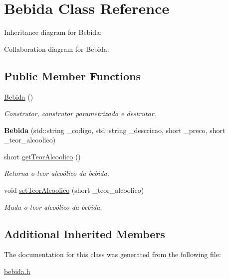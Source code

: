 \hypertarget{classBebida}{}\section{Bebida Class Reference}
\label{classBebida}


Inheritance diagram for Bebida\+:


Collaboration diagram for Bebida\+:
\subsection*{Public Member Functions}
\begin{DoxyCompactItemize}
\item 
\hyperlink{classBebida_afab3bc3b54a7e55049ed36fae3479dfb}{Bebida} ()\hypertarget{classBebida_afab3bc3b54a7e55049ed36fae3479dfb}{}\label{classBebida_afab3bc3b54a7e55049ed36fae3479dfb}

\begin{DoxyCompactList}\small\item\em Construtor, construtor parametrizado e destrutor. \end{DoxyCompactList}\item 
{\bfseries Bebida} (std\+::string \+\_\+codigo, std\+::string \+\_\+descricao, short \+\_\+preco, short \+\_\+teor\+\_\+alcoolico)\hypertarget{classBebida_a1d955c3b71c0159581806eafb05cd52a}{}\label{classBebida_a1d955c3b71c0159581806eafb05cd52a}

\item 
short \hyperlink{classBebida_a12416f60ae201da672ab9cd950d2fa70}{get\+Teor\+Alcoolico} ()\hypertarget{classBebida_a12416f60ae201da672ab9cd950d2fa70}{}\label{classBebida_a12416f60ae201da672ab9cd950d2fa70}

\begin{DoxyCompactList}\small\item\em Retorna o teor alcoólico da bebida. \end{DoxyCompactList}\item 
void \hyperlink{classBebida_afc4bd2bc544c2f0ff9a5ce3262c4c261}{set\+Teor\+Alcoolico} (short \+\_\+teor\+\_\+alcoolico)\hypertarget{classBebida_afc4bd2bc544c2f0ff9a5ce3262c4c261}{}\label{classBebida_afc4bd2bc544c2f0ff9a5ce3262c4c261}

\begin{DoxyCompactList}\small\item\em Muda o teor alcoólico da bebida. \end{DoxyCompactList}\end{DoxyCompactItemize}
\subsection*{Additional Inherited Members}


The documentation for this class was generated from the following file\+:\begin{DoxyCompactItemize}
\item 
\hyperlink{bebida_8h}{bebida.\+h}\end{DoxyCompactItemize}
